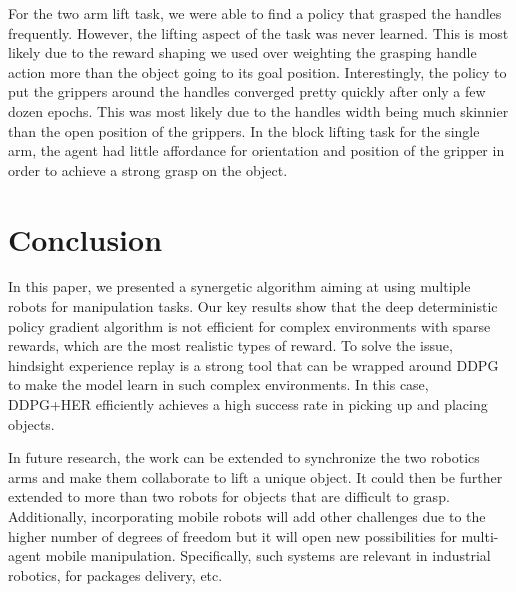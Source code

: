 \documentclass[conference]{IEEEtran}
\begin{document}
For the two arm lift task, we were able to find a policy that grasped the handles frequently. However, the lifting aspect of the task was never learned. This is most likely due to the reward shaping we used over weighting the grasping handle action more than the object going to its goal position. Interestingly, the policy to put the grippers around the handles converged pretty quickly after only a few dozen epochs. This was most likely due to the handles width being much skinnier than the open position of the grippers. In the block lifting task for the single arm, the agent had little affordance for orientation and position of the gripper in order to achieve a strong grasp on the object.

\section{Conclusion} \label{sec:ccl}

In this paper, we presented a synergetic algorithm aiming at using multiple robots for manipulation tasks. Our key results show that the deep deterministic policy gradient algorithm is not efficient for complex environments with sparse rewards, which are the most realistic types of reward. To solve the issue, hindsight experience replay is a strong tool that can be wrapped around DDPG to make the model learn in such complex environments. In this case, DDPG+HER efficiently achieves a high success rate in picking up and placing objects.

In future research, the work can be extended to synchronize the two robotics arms and make them collaborate to lift a unique object. It could then be further extended to more than two robots for objects that are difficult to grasp. Additionally, incorporating mobile robots will add other challenges due to the higher number of degrees of freedom but it will open new possibilities for multi-agent mobile manipulation. Specifically, such systems are relevant in industrial robotics, for packages delivery, etc.



\end{document}
